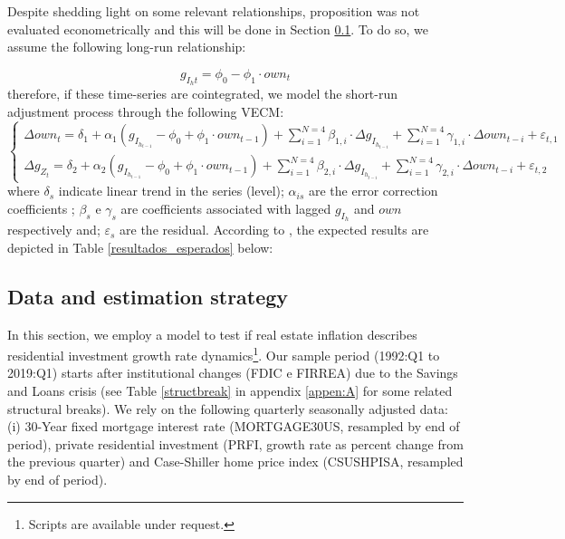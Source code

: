 Despite shedding light on some relevant relationships, \textcite{teixeira_crescimento_2015} proposition was not evaluated econometrically and this will be done in Section \ref{sec:estimation}. To do so, we assume the following long-run relationship:

\begin{equation}
g_{I_ht} = \phi_0 - \phi_1\cdot own_t
\end{equation}
therefore, if these time-series are cointegrated, we model the short-run adjustment process through the following VECM:
\begin{equation}
\begin{cases}
\Delta own_t = \delta_{1} + \alpha_1\left(g_{I_{h_{t-1}}} - \phi_0 + \phi_1\cdot own_{t-1}\right) + {\sum^{N=4}_{i=1}}\beta_{1,i}\cdot \Delta g_{I_{h_{t-i}}} +
\sum^{N=4}_{i=1}\gamma_{1,i}\cdot \Delta own_{t-i} +\varepsilon_{t,1}
\\
\Delta g_{Z_{t}} = \delta_{2} + \alpha_2\left(g_{I_{h_{t-1}}} - \phi_0 + \phi_1\cdot own_{t-1}\right) + \sum^{N=4}_{i=1}\beta_{2,i}\cdot \Delta g_{I_{h_{t-i}}} +
\sum^{N=4}_{i=1}\gamma_{2,i}\cdot \Delta own_{t-i} +\varepsilon_{t,2}
\end{cases}
\end{equation}
where $\delta_s$ indicate linear trend in the series (level);
$\alpha_{is}$ are the error correction coefficients ; 
$\beta_s$ e $\gamma_s$ are coefficients associated with lagged $g_{I_h}$ and $own$ respectively and; $\varepsilon_s$ are the residual.
According to \textcite{teixeira_crescimento_2015}, the expected results are depicted in Table \ref{resultados_esperados} below:




\subsection{Data and estimation strategy}\label{sec:estimation}

In this section, we employ a model to test if real estate inflation describes residential investment growth rate dynamics\footnote{Scripts are available under request.}. Our sample period (1992:Q1
to 2019:Q1) starts after institutional changes (FDIC e
FIRREA) due to the Savings and Loans crisis (see Table \ref{structbreak} in appendix \ref{appen:A} for some related structural breaks). 
We rely on the following  quarterly seasonally adjusted data: (i) 30-Year fixed mortgage interest rate (MORTGAGE30US, resampled by end of period), private residential investment (PRFI, growth rate as percent change from the previous quarter) and Case-Shiller home price index
(CSUSHPISA, resampled by end of period).

